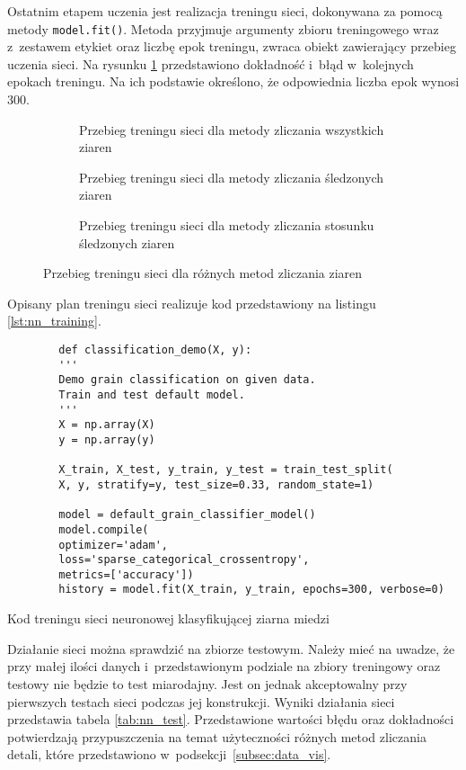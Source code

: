 Ostatnim etapem uczenia jest realizacja treningu sieci, dokonywana za
pomocą metody \texttt{model.fit()}.
Metoda przyjmuje argumenty zbioru treningowego wraz z~zestawem etykiet
oraz liczbę epok treningu, zwraca obiekt zawierający przebieg uczenia sieci.
Na rysunku \ref{fig:training_history} przedstawiono dokładność i~błąd
w~kolejnych epokach treningu.
Na ich podstawie określono, że odpowiednia liczba epok wynosi 300.
\begin{figure}[htb]
	\centering
	\begin{subfigure}[t]{0.3\textwidth}
		\centering
		
		\caption{Przebieg treningu sieci dla metody zliczania wszystkich
			ziaren}
	\end{subfigure}
	\hfill
	\begin{subfigure}[t]{0.3\textwidth}
		\centering
		
		\caption{Przebieg treningu sieci dla metody zliczania śledzonych
			ziaren}
	\end{subfigure}
	\hfill
	\begin{subfigure}[t]{0.3\textwidth}
		\centering
		
		\caption{Przebieg treningu sieci dla metody zliczania stosunku
			śledzonych ziaren}
	\end{subfigure}
	\caption{Przebieg treningu sieci dla różnych metod zliczania ziaren}
	\label{fig:training_history}
\end{figure}
Opisany plan treningu sieci realizuje kod przedstawiony na listingu
\ref{lst:nn_training}.
\begin{listing}[htb]
	\begin{verbatim}
		def classification_demo(X, y):
		'''
		Demo grain classification on given data.
		Train and test default model.
		'''
		X = np.array(X)
		y = np.array(y)

		X_train, X_test, y_train, y_test = train_test_split(
		X, y, stratify=y, test_size=0.33, random_state=1)

		model = default_grain_classifier_model()
		model.compile(
		optimizer='adam',
		loss='sparse_categorical_crossentropy',
		metrics=['accuracy'])
		history = model.fit(X_train, y_train, epochs=300, verbose=0)
	\end{verbatim}
	\caption{Kod treningu sieci neuronowej klasyfikującej ziarna miedzi}
	\label{lst:nn_training}
\end{listing}

Działanie sieci można sprawdzić na zbiorze testowym.
Należy mieć na uwadze, że przy małej ilości danych i~przedstawionym
podziale na zbiory treningowy oraz testowy nie będzie to test miarodajny.
Jest on jednak akceptowalny przy pierwszych testach sieci podczas jej
konstrukcji.
Wyniki działania sieci przedstawia tabela \ref{tab:nn_test}.
Przedstawione wartości błędu oraz dokładności potwierdzają przypuszczenia
na temat użyteczności różnych metod zliczania detali, które przedstawiono
w~podsekcji~\ref{subsec:data_vis}.

